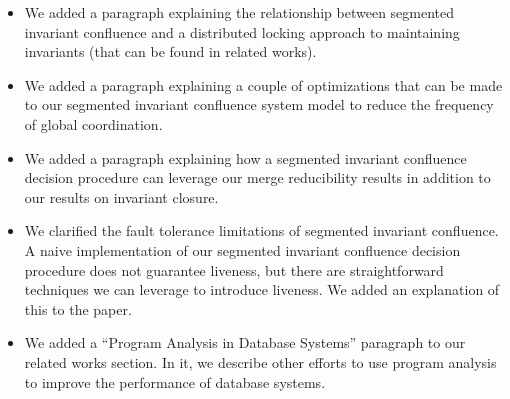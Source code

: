 \documentclass[12pt]{article}
\begin{document}
\begin{itemize}
  \item
    We added a paragraph explaining the relationship between segmented
    invariant confluence and a distributed locking approach to maintaining
    invariants (that can be found in related works).

  \item
    We added a paragraph explaining a couple of optimizations that can be made
    to our segmented invariant confluence system model to reduce the frequency
    of global coordination.

  \item
    We added a paragraph explaining how a segmented invariant confluence
    decision procedure can leverage our merge reducibility results in addition
    to our results on invariant closure.

  \item
    We clarified the fault tolerance limitations of segmented invariant
    confluence. A naive implementation of our segmented invariant confluence
    decision procedure does not guarantee liveness, but there are
    straightforward techniques we can leverage to introduce liveness. We added
    an explanation of this to the paper.

  \item
    We added a ``Program Analysis in Database Systems'' paragraph to our
    related works section. In it, we describe other efforts to use program
    analysis to improve the performance of database systems.
\end{itemize}



\end{document}
